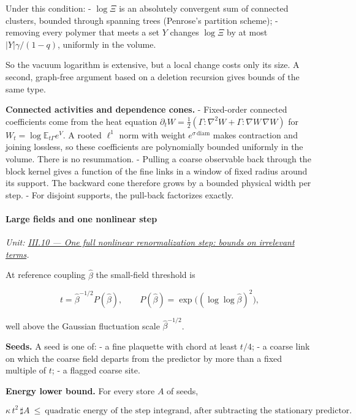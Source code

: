 \documentclass[
  letterpaper,
  11pt]{article}
\begin{document}
Under this condition: - \(\log\Xi\) is an absolutely convergent sum of
connected clusters, bounded through spanning trees (Penrose's partition
scheme); - removing every polymer that meets a set \(Y\) changes
\(\log\Xi\) by at most \(|Y|\gamma/(1-q)\), uniformly in the volume.

So the vacuum logarithm is extensive, but a local change costs only its
size. A second, graph-free argument based on a deletion recursion gives
bounds of the same type.

\textbf{Connected activities and dependence cones.} - Fixed-order
connected coefficients come from the heat equation
\(\partial_tW=\tfrac12(\Gamma:\nabla^2W+\Gamma:\nabla W\,\nabla W)\) for
\(W_t=\log\mathbb E_{t\Gamma}e^V\). A rooted \(\ell^1\) norm with weight
\(e^{\sigma\,\mathrm{diam}}\) makes contraction and joining lossless, so
these coefficients are polynomially bounded uniformly in the volume.
There is no resummation. - Pulling a coarse observable back through the
block kernel gives a function of the fine links in a window of fixed
radius around its support. The backward cone therefore grows by a
bounded physical width per step. - For disjoint supports, the pull-back
factorizes exactly.

\paragraph{Large fields and one nonlinear
step}\label{large-fields-and-one-nonlinear-step}

\emph{Unit:
\href{https://github.com/scottnarmstrong/yang-mills-informalization/blob/main/outline/units/III-10.md}{III.10
--- One full nonlinear renormalization step: bounds on irrelevant
terms}.}

At reference coupling \(\hat\beta\) the small-field threshold is

\[t=\hat\beta^{-1/2}P(\hat\beta),\qquad P(\hat\beta)=\exp\big((\log\log\hat\beta)^2\big),\]

well above the Gaussian fluctuation scale \(\hat\beta^{-1/2}\).

\textbf{Seeds.} A seed is one of: - a fine plaquette with chord at least
\(t/4\); - a coarse link on which the coarse field departs from the
predictor by more than a fixed multiple of \(t\); - a flagged coarse
site.

\textbf{Energy lower bound.} For every store \(A\) of seeds,

\[\kappa\,t^2\,\sharp A\ \le\ \text{quadratic energy of the step integrand, after subtracting the stationary predictor}.\]
\end{document}
